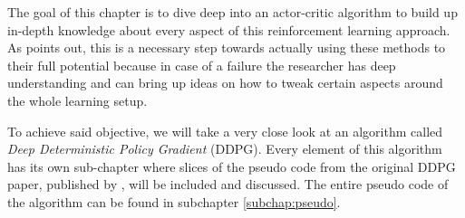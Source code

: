 The goal of this chapter is to dive deep into an actor-critic algorithm to build up in-depth knowledge about every aspect of this reinforcement learning approach. As \cite{tim2018} points out, this is a necessary step towards actually using these methods to their full potential because in case of a failure the researcher has deep understanding and can bring up ideas on how to tweak certain aspects around the whole learning setup.
\par
To achieve said objective, we will take a very close look at an algorithm called \textit{Deep Deterministic Policy Gradient} (DDPG). Every element of this algorithm has its own sub-chapter where slices of the pseudo code from the original DDPG paper, published by \cite{lillicrap2019continuous}, will be included and discussed. The entire pseudo code of the algorithm can be found in subchapter \ref{subchap:pseudo}.

